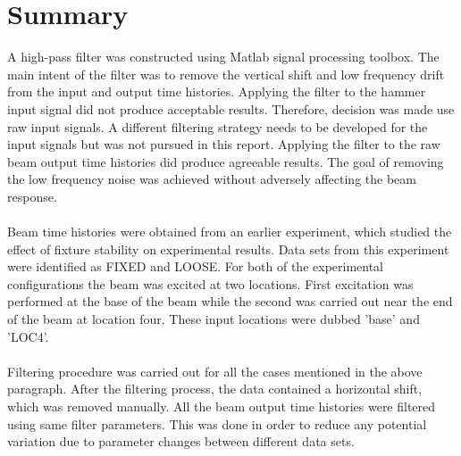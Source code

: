 \documentclass[paper=a4, fontsize=12pt]{scrartcl} %
\begin{document}
\section*{Summary}
A high-pass filter was constructed using Matlab signal processing toolbox. The main intent of the filter was to remove the vertical shift and low frequency drift from the input and output time histories. Applying the filter to the hammer input signal did not produce acceptable results. Therefore, decision was made use raw input signals. A different filtering strategy needs to be developed for the input signals but was not pursued in this report. Applying the filter to the raw beam output time histories did produce agreeable results. The goal of removing the low frequency noise was achieved without adversely affecting the beam response.
\\
\\
Beam time histories were obtained from an earlier experiment, which studied the effect of fixture stability on experimental results. Data sets from this experiment were identified as FIXED and LOOSE. For both of the experimental configurations the beam was excited at two locations. First excitation was performed at the base of the beam while the second was carried out near the end of the beam at location four. These input locations were dubbed 'base' and 'LOC4'.
\\
\\
Filtering procedure was carried out for all the cases mentioned in the above paragraph. After the filtering process, the data contained a horizontal shift, which was removed manually. All the beam output time histories were filtered using same filter parameters. This was done in order to reduce any potential variation due to parameter changes between different data sets.
\\
\\
\end{document}
